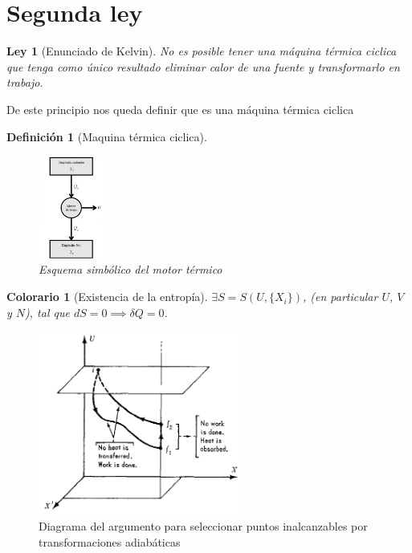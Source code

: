\documentclass{book}
\numberwithin{equation}{section} %
\newtheorem{definition}{Definición}[chapter]
\newtheorem{law}{Ley}[chapter]
\newtheorem{collorary}{Colorario}[chapter]
\begin{document}
\section{Segunda ley}
\begin{law}[Enunciado de Kelvin]
No es posible tener una máquina térmica ciclica que tenga como único resultado eliminar calor de una fuente y transformarlo en trabajo.
\end{law}
De este principio nos queda definir que es una máquina térmica ciclica
\begin{definition}[Maquina térmica ciclica]
\begin{figure}[H]
    \centering
    \includegraphics[width=0.19\textwidth]{motor}
    \caption{Esquema simbólico del motor térmico}
\end{figure}
\end{definition}


\begin{collorary}[Existencia de la entropía]
 $\exists S = S(U, \{X_i\})$, (en particular $U$, $V$ y $N$), tal que  $dS = 0 \implies \delta Q = 0$.
\end{collorary}

\begin{figure}[H]
\centering
\includegraphics[width=0.6\textwidth]{segunda_ley_espacio}
\caption{Diagrama del argumento para seleccionar puntos inalcanzables por transformaciones adiabáticas}
\label{fig:segunda_ley_espacio}
\end{figure}
\end{document}
